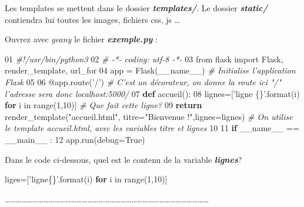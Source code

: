 \documentclass{article}
\newenvironment{Shaded}{}{}
\newcommand{\KeywordTok}[1]{\textcolor[rgb]{0.00,0.44,0.13}{\textbf{{#1}}}}
\newcommand{\DataTypeTok}[1]{\textcolor[rgb]{0.56,0.13,0.00}{{#1}}}
\newcommand{\DecValTok}[1]{\textcolor[rgb]{0.25,0.63,0.44}{{#1}}}
\newcommand{\CharTok}[1]{\textcolor[rgb]{0.25,0.44,0.63}{{#1}}}
\newcommand{\StringTok}[1]{\textcolor[rgb]{0.25,0.44,0.63}{{#1}}}
\newcommand{\CommentTok}[1]{\textcolor[rgb]{0.38,0.63,0.69}{\textit{{#1}}}}
\newcommand{\OtherTok}[1]{\textcolor[rgb]{0.00,0.44,0.13}{{#1}}}
\newcommand{\NormalTok}[1]{{#1}}
\begin{document}
Les templates se mettent dans le dossier \textbf{\emph{templates/}}. Le
dossier \textbf{\emph{static/}} contiendra lui toutes les images,
fichiers css, js \ldots{}

Ouvrez avec \emph{geany} le fichier \textbf{\emph{exemple.py}} :

\begin{Shaded}
\begin{Highlighting}[]
\DecValTok{01} \CommentTok{#!/usr/bin/python3}
\DecValTok{02} \CommentTok{# -*- coding: utf-8 -*-}
\DecValTok{03} \CharTok{from} \NormalTok{flask }\CharTok{import} \NormalTok{Flask, render_template, url_for}
\DecValTok{04} \NormalTok{app = Flask(}\OtherTok{__name__}\NormalTok{)   }\CommentTok{# Initialise l'application Flask}
\DecValTok{05}
\NormalTok{06 @app.route(}\StringTok{'/'}\NormalTok{)  }\CommentTok{# C'est un décorateur, on donne la route ici "/"  l'adresse sera donc localhost:5000/}
\DecValTok{07} \KeywordTok{def} \NormalTok{accueil():}
\DecValTok{08}     \NormalTok{lignes=[}\StringTok{'ligne \{\}'}\NormalTok{.}\DataTypeTok{format}\NormalTok{(i) }\KeywordTok{for} \NormalTok{i in }\DataTypeTok{range}\NormalTok{(}\DecValTok{1}\NormalTok{,}\DecValTok{10}\NormalTok{)] }\CommentTok{# Que fait cette ligne?}
\DecValTok{09}     \KeywordTok{return} \NormalTok{render_template(}\StringTok{"accueil.html"}\NormalTok{, titre=}\StringTok{"Bienvenue !"}\NormalTok{,lignes=lignes) }\CommentTok{# On utilise le template accueil.html, avec les variables titre et lignes}
\DecValTok{10}
\DecValTok{11} \KeywordTok{if} \OtherTok{__name__} \NormalTok{== __main__ :}
\DecValTok{12}     \NormalTok{app.run(debug=}\OtherTok{True}\NormalTok{)}
\end{Highlighting}
\end{Shaded}

Dans le code ci-dessous, quel est le contenu de la variable
\textbf{\emph{lignes}}?

\begin{Shaded}
\begin{Highlighting}[]
 \NormalTok{liges=[}\StringTok{'ligne\{\}'}\NormalTok{.}\DataTypeTok{format}\NormalTok{(i) }\KeywordTok{for} \NormalTok{i in }\DataTypeTok{range}\NormalTok{(}\DecValTok{1}\NormalTok{,}\DecValTok{10}\NormalTok{)]}
\end{Highlighting}
\end{Shaded}

\ldots{}\ldots{}\ldots{}\ldots{}\ldots{}\ldots{}\ldots{}\ldots{}\ldots{}\ldots{}\ldots{}\ldots{}\ldots{}\ldots{}\ldots{}\ldots{}\ldots{}\ldots{}\ldots{}\ldots{}\ldots{}\ldots{}\ldots{}\ldots{}\ldots{}\ldots{}\ldots{}\ldots{}\ldots{}\ldots{}\ldots{}\ldots{}\ldots{}\ldots{}\ldots{}\ldots{}\ldots{}
\end{document}
